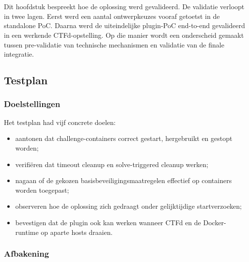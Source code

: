 
\chapter{}%
\label{ch:validatie}

Dit hoofdstuk bespreekt hoe de oplossing werd gevalideerd. De validatie verloopt in twee lagen. Eerst werd een aantal ontwerpkeuzes vooraf getoetst in de standalone PoC. Daarna werd de uiteindelijke plugin-PoC end-to-end gevalideerd in een werkende CTFd-opstelling. Op die manier wordt een onderscheid gemaakt tussen pre-validatie van technische mechanismen en validatie van de finale integratie.

\section{Testplan}%
\label{sec:validatie-testplan}

\subsection{Doelstellingen}

Het testplan had vijf concrete doelen:

\begin{itemize}
  \item aantonen dat challenge-containers correct gestart, hergebruikt en gestopt worden;
  \item verifi\"eren dat timeout cleanup en solve-triggered cleanup werken;
  \item nagaan of de gekozen basisbeveiligingsmaatregelen effectief op containers worden toegepast;
  \item observeren hoe de oplossing zich gedraagt onder gelijktijdige startverzoeken;
  \item bevestigen dat de plugin ook kan werken wanneer CTFd en de Docker-runtime op aparte hosts draaien.
\end{itemize}

\subsection{Afbakening}

